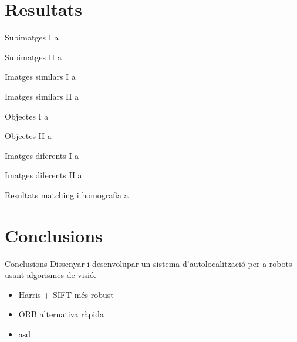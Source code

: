 \documentclass[xcolor=table, 11pt]{beamer}
\newcommand\tz{\fontsize{13}{15.6}\selectfont}
\begin{document}
\section{Resultats}

	\begin{frame}{Subimatges I}
		\tz
		a
	\end{frame}

	\begin{frame}{Subimatges II}
		\tz
		a
	\end{frame}

	\begin{frame}{Imatges similars I}
		\tz
		a
	\end{frame}

	\begin{frame}{Imatges similars II}
		\tz
		a
	\end{frame}

	\begin{frame}{Objectes I}
		\tz
		a
	\end{frame}

	\begin{frame}{Objectes II}
		\tz
		a
	\end{frame}

	\begin{frame}{Imatges diferents I}
		\tz
		a
	\end{frame}

	\begin{frame}{Imatges diferents II}
		\tz
		a
	\end{frame}

	\begin{frame}{Resultats matching i homografia}
		\tz
		a
	\end{frame}


\section{Conclusions}

	\begin{frame}{Conclusions}
		\tz
		Dissenyar i desenvolupar un sistema d'autolocalització per a robots usant algorismes de visió.\\
		\vspace{1em}

		\begin{itemize}
			\item Harris + SIFT més robust
			\item ORB alternativa ràpida
			\item asd
		\end{itemize}
	\end{frame}
\end{document}
